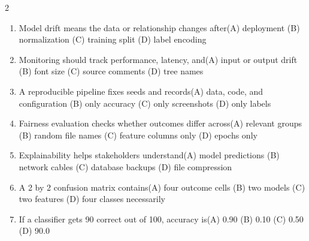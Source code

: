 \documentclass[a4paper]{article}
\begin{document}
\begin{multicols*}{2}
\begin{enumerate}[resume]
\item Model drift means the data or relationship changes after\newline\hspace*{0.6em}(A) deployment \quad (B) normalization \newline\hspace*{0.6em}(C) training split \quad (D) label encoding
\item Monitoring should track performance, latency, and\newline\hspace*{0.6em}(A) input or output drift \quad (B) font size \newline\hspace*{0.6em}(C) source comments \quad (D) tree names
\item A reproducible pipeline fixes seeds and records\newline\hspace*{0.6em}(A) data, code, and configuration \quad (B) only accuracy \newline\hspace*{0.6em}(C) only screenshots \quad (D) only labels
\item Fairness evaluation checks whether outcomes differ across\newline\hspace*{0.6em}(A) relevant groups \quad (B) random file names \newline\hspace*{0.6em}(C) feature columns only \quad (D) epochs only
\item Explainability helps stakeholders understand\newline\hspace*{0.6em}(A) model predictions \quad (B) network cables \newline\hspace*{0.6em}(C) database backups \quad (D) file compression
\item A 2 by 2 confusion matrix contains\newline\hspace*{0.6em}(A) four outcome cells \quad (B) two models \newline\hspace*{0.6em}(C) two features \quad (D) four classes necessarily
\item If a classifier gets 90 correct out of 100, accuracy is\newline\hspace*{0.6em}(A) 0.90 \quad (B) 0.10 \newline\hspace*{0.6em}(C) 0.50 \quad (D) 90.0

\end{enumerate}
\end{multicols*}
\end{document}

